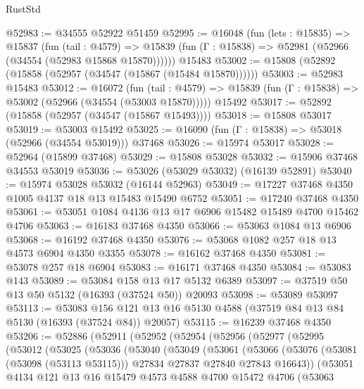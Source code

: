 \begin{lexlean}{RustStd}
\begin{coremodule}
@52983 := @34555 @52922 @51459
@52995 := @16048
    (fun (lets : @15835) =>
    @15837
      (fun (tail : @4579) =>
      @15839 (fun (Γ : @15838) => @52981 (@52966 (@34554 (@52983 @15868 @15870))))))
    @15483
@53002 := @15808 (@52892 (@15858 (@52957 (@34547 (@15867 (@15484 @15870))))))
@53003 := @52983 @15483
@53012 := @16072
    (fun (tail : @4579) => @15839 (fun (Γ : @15838) => @53002 (@52966 (@34554 (@53003 @15870)))))
    @15492
@53017 := @52892 (@15858 (@52957 (@34547 (@15867 @15493))))
@53018 := @15808 @53017
@53019 := @53003 @15492
@53025 := @16090 (fun (Γ : @15838) => @53018 (@52966 (@34554 @53019))) @37468
@53026 := @15974 @53017
@53028 := @52964 (@15899 @37468)
@53029 := @15808 @53028
@53032 := @15906 @37468 @34553 @53019
@53036 := @53026 (@53029 @53032) (@16139 @52891)
@53040 := @15974 @53028 @53032 (@16144 @52963)
@53049 := @17227 @37468 @4350 @1005 @4137 @18 @13 @15483 @15490 @6752
@53051 := @17240 @37468 @4350
@53061 := @53051 @1084 @4136 @13 @17 @6906 @15482 @15489 @4700 @15462 @4706
@53063 := @16183 @37468 @4350
@53066 := @53063 @1084 @13 @6906
@53068 := @16192 @37468 @4350
@53076 := @53068 @1082 @257 @18 @13 @4573 @6904 @4350 @3355
@53078 := @16162 @37468 @4350
@53081 := @53078 @257 @18 @6904
@53083 := @16171 @37468 @4350
@53084 := @53083 @143
@53089 := @53084 @158 @13 @17 @5132 @6389
@53097 := @37519 @50 @13 @50 @5132 (@16393 (@37524 @50)) @20093
@53098 := @53089 @53097
@53113 := @53083
    @156
    @121
    @13
    @16
    @5130
    @4588
    (@37519 @84 @13 @84 @5130 (@16393 (@37524 @84)) @20057)
@53115 := @16239 @37468 @4350
@53206 := @52886
    (@52911
      (@52952
        (@52954
          (@52956
            (@52977
              (@52995
                (@53012
                  (@53025
                    (@53036
                      (@53040
                        (@53049
                          (@53061
                            (@53066
                              (@53076
                                (@53081 (@53098 (@53113 @53115)))
                                @27834
                                @27837
                                @27840
                                @27843
                                @16643))
                            (@53051
                              @4134
                              @121
                              @13
                              @16
                              @15479
                              @4573
                              @4588
                              @4700
                              @15472
                              @4706
                              (@53063

\end{coremodule}
\end{lexlean}
